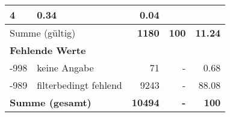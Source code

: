 \begin{longtable}{lXrrr}
       \num{4} &
       \num[round-mode=places,round-precision=2]{0.34} &
         \num[round-mode=places,round-precision=2]{0.04} \\
     \midrule
     \multicolumn{2}{l}{Summe (gültig)} &
       \textbf{\num{1180}} &
     \textbf{\num{100}} &
       \textbf{\num[round-mode=places,round-precision=2]{11.24}} \\
     \multicolumn{5}{l}{\textbf{Fehlende Werte}}\\
       -998 &
       keine Angabe &
         \num{71} &
        - &
         \num[round-mode=places,round-precision=2]{0.68} \\
       -989 &
       filterbedingt fehlend &
         \num{9243} &
        - &
         \num[round-mode=places,round-precision=2]{88.08} \\
     \midrule
     \multicolumn{2}{l}{\textbf{Summe (gesamt)}} &
          \textbf{\num{10494}} &
        \textbf{-} &
        \textbf{\num{100}} \\
     \bottomrule
     \end{longtable}
     
